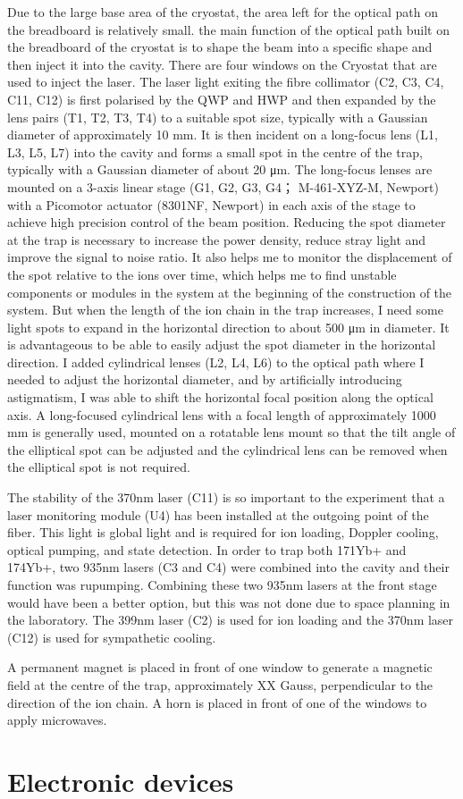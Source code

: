 Due to the large base area of the cryostat, the area left for the optical path on the breadboard is relatively small. the main function of the optical path built on the breadboard of the cryostat is to shape the beam into a specific shape and then inject it into the cavity. There are four windows on the Cryostat that are used to inject the laser. The laser light exiting the fibre collimator (C2, C3, C4, C11, C12) is first polarised by the QWP and HWP and then expanded by the lens pairs (T1, T2, T3, T4) to a suitable spot size, typically with a Gaussian diameter of approximately 10 mm. It is then incident on a long-focus lens (L1, L3, L5, L7) into the cavity and forms a small spot in the centre of the trap, typically with a Gaussian diameter of about 20 μm. The long-focus lenses are mounted on a 3-axis linear stage (G1, G2, G3, G4； M-461-XYZ-M, Newport) with a Picomotor actuator (8301NF, Newport) in each axis of the stage to achieve high precision control of the beam position. Reducing the spot diameter at the trap is necessary to increase the power density, reduce stray light and improve the signal to noise ratio. It also helps me to monitor the displacement of the spot relative to the ions over time, which helps me to find unstable components or modules in the system at the beginning of the construction of the system. But when the length of the ion chain in the trap increases, I need some light spots to expand in the horizontal direction to about 500 μm in diameter. It is advantageous to be able to easily adjust the spot diameter in the horizontal direction. I added cylindrical lenses (L2, L4, L6) to the optical path where I needed to adjust the horizontal diameter, and by artificially introducing astigmatism, I was able to shift the horizontal focal position along the optical axis. A long-focused cylindrical lens with a focal length of approximately 1000 mm is generally used, mounted on a rotatable lens mount so that the tilt angle of the elliptical spot can be adjusted and the cylindrical lens can be removed when the elliptical spot is not required.

The stability of the 370nm laser (C11) is so important to the experiment that a laser monitoring module (U4) has been installed at the outgoing point of the fiber. This light is global light and is required for ion loading, Doppler cooling, optical pumping, and state detection. In order to trap both 171Yb+ and 174Yb+, two 935nm lasers (C3 and C4) were combined into the cavity and their function was rupumping. Combining these two 935nm lasers at the front stage would have been a better option, but this was not done due to space planning in the laboratory. The 399nm laser (C2) is used for ion loading and the 370nm laser (C12) is used for sympathetic cooling.

A permanent magnet is placed in front of one window to generate a magnetic field at the centre of the trap, approximately XX Gauss, perpendicular to the direction of the ion chain. A horn is placed in front of one of the windows to apply microwaves.



\section{Electronic devices}
